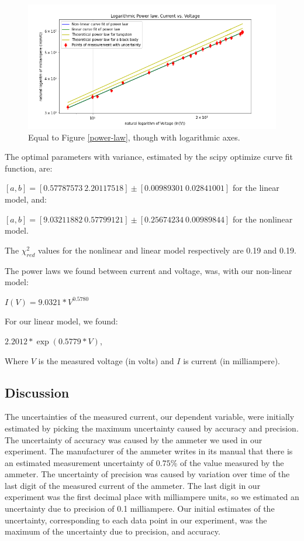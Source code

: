 \documentclass[letterpaper,12pt]{article}
\begin{document}
\begin{figure}[H]
  \centering
  \includegraphics[width=0.95\linewidth]{../Exercise3/Log_Power_law.png}    
  \caption{Equal to Figure \ref{power-law}, though with logarithmic axes.}
  \label{power-law-log}
\end{figure}

The optimal parameters with variance, estimated by the scipy optimize curve fit function, are: 

$[a,b] = [0.57787573\ 2.20117518] \pm [0.00989301\ 0.02841001]$  for the linear model, and: 

$[a,b] = [9.03211882\ 0.57799121] \pm [0.25674234\ 0.00989844]$ for the nonlinear model.

The $\chi^2_{red}$ values for the nonlinear and linear model respectively are 0.19 and 0.19.

The power laws we found between current and voltage, was, with our non-linear model: 

$I(V)= 9.0321 * V ^ {0.5780} $

For our linear model, we found:  

$2.2012 * \exp( 0.5779 * V )$,

Where $V$ is the measured voltage (in volts) and $I$ is current (in milliampere).

\subsection{Discussion}

The uncertainties of the measured current, our dependent variable, 
were initially estimated by picking the maximum uncertainty caused by accuracy and precision. 
The uncertainty of accuracy was caused by the ammeter we used in our experiment. 
The manufacturer of the ammeter writes in its manual that there is an 
estimated measurement uncertainty of $0.75$\% of the value measured by the ammeter. 
The uncertainty of precision was caused by variation over time of the last digit of 
the measured current of the ammeter. The last digit in our experiment was the first 
decimal place with milliampere units, so we estimated an uncertainty due to precision 
of 0.1 milliampere. Our initial estimates of the uncertainty, corresponding to each
 data point in our experiment, was the maximum of the uncertainty due to precision, and accuracy.
\end{document}
